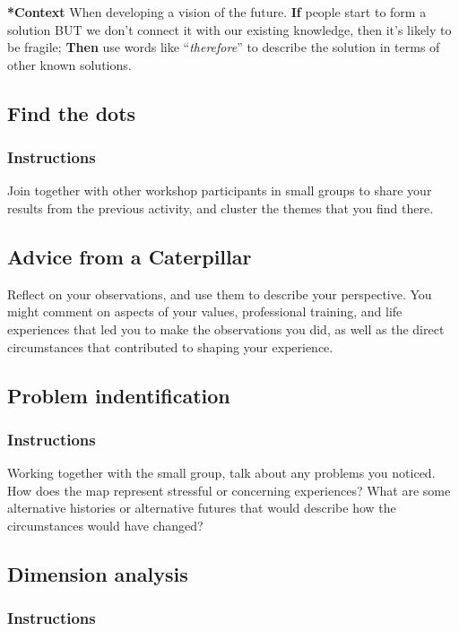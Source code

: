 \documentclass{article}
\begin{document}
\textbf{*Context} When developing a vision of the future. \textbf{If} people start to
form a solution BUT we don't connect it with our existing knowledge,
then it's likely to be fragile; \textbf{Then} use words like ``\emph{therefore}'' to
describe the solution in terms of other known solutions.
\subsection{Find the dots}
\label{a853be79-85c1-4ffa-9750-459192c539e8}
\subsubsection{Instructions}

Join together with other workshop participants in small groups to
share your results from the previous activity, and cluster the themes
that you find there.
\subsection{Advice from a Caterpillar}
\label{0ef4b185-513f-40c2-b884-6213601bbe09}
Reflect on your observations, and use them to describe your
perspective.  You might comment on aspects of your values,
professional training, and life experiences that led you to make the
observations you did, as well as the direct circumstances that
contributed to shaping your experience.
\subsection{Problem indentification}

\subsubsection{Instructions}
Working together with the small group, talk about any problems you
noticed.  How does the map represent stressful or concerning
experiences?  What are some alternative histories or alternative
futures that would describe how the circumstances would have changed?
\subsection{Dimension analysis}

\subsubsection{Instructions}
\end{document}
